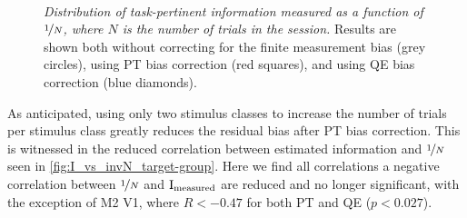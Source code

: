 \begin{figure}[htbp]
    \centering
    \hspace*{\fill}
    \hspace*{\fill}\hspace{.2cm}\hspace*{\fill}
    \hspace*{\fill}
    \\
    \hspace*{\fill}
    \hspace*{\fill}\hspace{.2cm}\hspace*{\fill}
    \hspace*{\fill}
    \caption{\textit{Distribution of task-pertinent information measured as a function of $\nicefrac{1}{N}$, where $N$ is the number of trials in the session.}
Results are shown both without correcting for the finite measurement bias (grey circles), using \ac{PT} bias correction (red squares), and using \ac{QE} bias correction (blue diamonds).
}
    \label{fig:I_vs_invN_target-group}
\end{figure}


As anticipated, using only two stimulus classes to increase the number of trials per stimulus class greatly reduces the residual bias after \ac{PT} bias correction.
This is witnessed in the reduced correlation between estimated information and $\nicefrac{1}{N}$ seen in \autoref{fig:I_vs_invN_target-group}.
Here we find all correlations a negative correlation between $\nicefrac{1}{N}$ and $\operatorname{I}_\text{measured}$ are reduced and no longer significant, with the exception of \ac{M2} \ac{V1}, where $R<-0.47$ for both \ac{PT} and \ac{QE} ($p < 0.027$).


